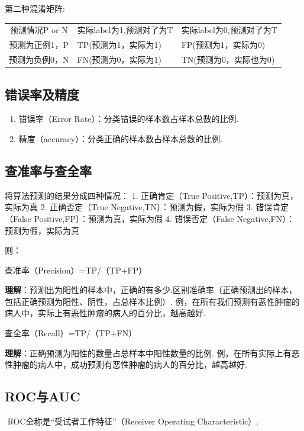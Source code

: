 第二种混淆矩阵:

\begin{longtable}[]{ cll }
预测情况P or N & 实际label为1,预测对了为T &
实际label为0,预测对了为T\tabularnewline
预测为正例1，P & TP(预测为1，实际为1) &
FP(预测为1，实际为0)\tabularnewline
预测为负例0，N & FN(预测为0，实际为1) &
TN(预测为0，实际也为0)\tabularnewline
\end{longtable}

\subsection{错误率及精度}\label{ux9519ux8befux7387ux53caux7cbeux5ea6}

\begin{enumerate}
\def\labelenumi{\arabic{enumi}.}
\item
  错误率（Error Rate）：分类错误的样本数占样本总数的比例.
\item
  精度（accuracy）：分类正确的样本数占样本总数的比例.
\end{enumerate}

\subsection{查准率与查全率}\label{ux67e5ux51c6ux7387ux4e0eux67e5ux5168ux7387}

将算法预测的结果分成四种情况： 1. 正确肯定（True
Positive,TP）：预测为真，实际为真 2. 正确否定（True
Negative,TN）：预测为假，实际为假 3. 错误肯定（False
Positive,FP）：预测为真，实际为假 4. 错误否定（False
Negative,FN）：预测为假，实际为真

则：

查准率（Precision）=TP/（TP+FP）

\textbf{理解}：预测出为阳性的样本中，正确的有多少.区别准确率（正确预测出的样本，包括正确预测为阳性、阴性，占总样本比例）.
例，在所有我们预测有恶性肿瘤的病人中，实际上有恶性肿瘤的病人的百分比，越高越好.

查全率（Recall）=TP/（TP+FN）

\textbf{理解}：正确预测为阳性的数量占总样本中阳性数量的比例.
例，在所有实际上有恶性肿瘤的病人中，成功预测有恶性肿瘤的病人的百分比，越高越好.

\subsection{ROC与AUC}\label{rocux4e0eauc}

​ ROC全称是``受试者工作特征''（Receiver Operating Characteristic）.

